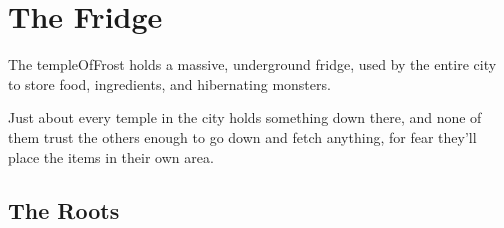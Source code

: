 \section{The Fridge}
\label{theFridge}

\begin{multicols}{2}

\noindent
The \gls{templeOfFrost} holds a massive, underground fridge, used by the entire city to store food, \glspl{ingredient}, and hibernating \glspl{monster}.

Just about every \gls{temple} in the city holds something down there, and none of them trust the others enough to go down and fetch anything, for fear they'll place the items in their own area.

\renewcommand\csComments{
  \callout{12,21}{0,0}{\ref{fStairs}:~\nameref{fStairs}}{}
  \callout[12]{12,18}{0,0.5}{\ref{fHallStore}:~\nameref{fHallStore}}{}
  \callout[10]{10,15}{0,0}{\ref{fLift}:~\nameref{fLift}}{}
  \callout[10]{17,20}{-1,0}{\ref{fWheat}:~\nameref{fWheat}}{chalk lines the ground}
  \callout[10]{17,18}{-1,0}{\ref{fIngStore}:~\nameref{fIngStore}}{}
  \callout[10]{1,22}{2,-1}{\ref{fOffice}:~\nameref{fOffice}}{Everything entered must be registered}
  \callout[14]{2,17}{2,0}{\ref{fDip}:~\nameref{fDip}}{with oil barrels}
  \callout[10]{1,14}{2,-1}{\ref{fSide}:~\nameref{fSide}}{}
  \callout{12,16}{1,0}{Secrets}{}
  \callout{6,11}{4,0}{\ref{fBoat}:~\nameref{fBoat}}{there's a boat}
  \callout{8,0}{0,2.5}{\ref{fCrossbow}:~\nameref{fCrossbow}}{}
  \callout[10]{5,1}{0,0}{\ref{fHibernation}:~\nameref{fHibernation}}{}
  \callout[10]{11,1}{0,0}{\ref{fWeaponStore}:~\nameref{fWeaponStore}}{}
  \callout{17,7}{-1.8,-2.3}{\ref{fFabrics}:~\nameref{fFabrics}}{}
  \callout[10]{17,4}{-1,-2}{\ref{fGrain}:~\nameref{fGrain}}{}
  \callout[10]{16,1}{0,0}{\ref{fSpirits}:~\nameref{fSpirits}}{}
  \mapFeature{15,2}{\Huge \glssymbol{abderian}}
  \mapFeature{16,9}{\Huge \glssymbol{wrecan}}
  \mapFeature{3,6}{\Huge \glssymbol{sylf}}
  \mapFeature{2,1}{\Huge \glssymbol{sable}}
  \mapFeature{13,6}{\Huge \glssymbol{sable}}
  \mapFeature{12,3.6}{\Huge \glssymbol{paik}}
  \mapFeature{8,12}{\Huge \glssymbol{yonder}}
}


\subsection{The Roots}



\end{multicols}
